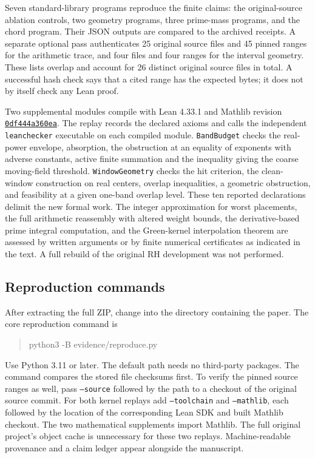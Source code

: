 \documentclass[12pt,letterpaper]{article}
\begin{document}
Seven standard-library programs reproduce the finite claims: the original-source ablation controls, two geometry programs, three prime-mass programs, and the chord program. Their JSON outputs are compared to the archived receipts. A separate optional pass authenticates 25 original source files and 45 pinned ranges for the arithmetic trace, and four files and four ranges for the interval geometry. These lists overlap and account for 26 distinct original source files in total. A successful hash check says that a cited range has the expected bytes; it does not by itself check any Lean proof.

Two supplemental modules compile with Lean 4.33.1 and Mathlib revision \href{https://github.com/leanprover-community/mathlib4/tree/0df444a360eaa60ab8c11dca51a86af692955474}{\texttt{0df444a360ea}}. The replay records the declared axioms and calls the independent \texttt{leanchecker} executable on each compiled module. \texttt{BandBudget} checks the real-power envelope, absorption, the obstruction at an equality of exponents with adverse constants, active finite summation and the inequality giving the coarse moving-field threshold. \texttt{WindowGeometry} checks the hit criterion, the clean-window construction on real centers, overlap inequalities, a geometric obstruction, and feasibility at a given one-band overlap level. These ten reported declarations delimit the new formal work. The integer approximation for worst placements, the full arithmetic reassembly with altered weight bounds, the derivative-based prime integral computation, and the Green-kernel interpolation theorem are assessed by written arguments or by finite numerical certificates as indicated in the text. A full rebuild of the original RH development was not performed.

\subsection{Reproduction commands}
After extracting the full ZIP, change into the directory containing the paper. The core reproduction command is
\begin{quote}\ttfamily python3 -B evidence/reproduce.py\end{quote}
Use Python 3.11 or later. The default path needs no third-party packages. The command compares the stored file checksums first. To verify the pinned source ranges as well, pass \texttt{--source} followed by the path to a checkout of the original source commit. For both kernel replays add \texttt{--toolchain} and \texttt{--mathlib}, each followed by the location of the corresponding Lean SDK and built Mathlib checkout. The two mathematical supplements import Mathlib. The full original project's object cache is unnecessary for these two replays. Machine-readable provenance and a claim ledger appear alongside the manuscript.
\end{document}
